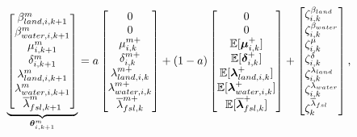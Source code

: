 \begin{equation}\label{eq:param_evolution}
    \underbrace{\begin{bmatrix}
    \beta_{land,i,k+1}^{m}\\ 
    \beta_{water,i,k+1}^{m}\\
    \mu_{i,k+1}^{m}\\ 
    \delta_{i,k+1}^{m}\\ 
    \lambda_{land,i,k+1}^{m}\\ 
    \lambda_{water,i,k+1}^{m}\\ 
    \overline{\lambda}_{fsl,k+1}^{m}\\
    \end{bmatrix}}_{\*\theta_{i,k+1}^m} = a
    \begin{bmatrix}
    0\\ 
    0\\
    \mu_{i,k}^{m+}\\ 
    \delta_{i,k}^{m+}\\ 
    \lambda_{land,i,k}^{m+}\\ 
    \lambda_{water,i,k}^{m+}\\ 
    \overline{\lambda}_{fsl,k}^{m+}\\
    \end{bmatrix} + (1 - a)
    \begin{bmatrix}
    0\\
    0\\
    \mathbb{E}[\*\mu_{i,k}^+]\\ 
    \mathbb{E}[\*\delta_{i,k}^{+}]\\ 
    \mathbb{E}[\*\lambda_{land,i,k}^{+}]\\ 
    \mathbb{E}[\*\lambda_{water,i,k}^{+}]\\ 
    \mathbb{E}[\overline{\*\lambda}_{fsl,k}^{+}]\\
    \end{bmatrix} +
    \begin{bmatrix*}[l]
    \zeta_{i,k}^{\beta_{land}}\\
    \zeta_{i,k}^{\beta_{water}}\\
    \zeta_{i,k}^\mu\\ 
    \zeta_{i,k}^\delta\\
    \zeta_{i,k}^{\lambda_{land}}\\
    \zeta_{i,k}^{\lambda_{water}}\\
    \zeta_{k}^{\overline{\lambda}_{fsl}}
    \end{bmatrix*}\text{,} \qquad 
    \begin{matrix*}[l]

\end{matrix*}
\end{equation}
